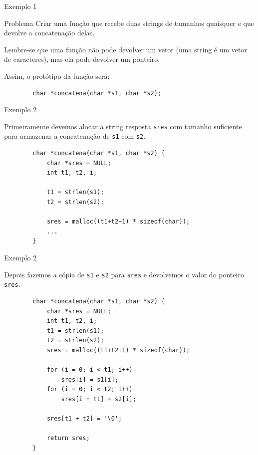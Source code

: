 \documentclass[handout]{beamer}
\newcommand{\cod}[1]{\texttt{#1}}
\begin{document}
\begin{frame}[fragile]{Exemplo 1}

    \begin{block}{Problema}
        Criar uma função que recebe duas strings de tamanhos quaisquer e que devolve a concatenação delas.
    \end{block}
    
    \pause
    Lembre-se que uma função não pode devolver um vetor (uma string é um vetor de caracteres), mas ela pode devolver um ponteiro.

    Assim, o protótipo da função será:
    \begin{verbatim}
        char *concatena(char *s1, char *s2);
    \end{verbatim}

\end{frame}

\begin{frame}[fragile]{Exemplo 2}
    
    Primeiramente devemos alocar a string resposta \cod{sres} com tamanho suficiente para armazenar a concatenação de \cod{s1} com \cod{s2}.

    \begin{verbatim}
        char *concatena(char *s1, char *s2) {
            char *sres = NULL;
            int t1, t2, i;
    
            t1 = strlen(s1);
            t2 = strlen(s2);

            sres = malloc((t1+t2+1) * sizeof(char));
            ...
        }
    \end{verbatim}

\end{frame}

\begin{frame}[fragile]{Exemplo 2}

    Depois fazemos a cópia de \cod{s1} e \cod{s2} para \cod{sres} e devolvemos o valor do ponteiro \cod{sres}.

    \begin{verbatim}
        char *concatena(char *s1, char *s2) {
            char *sres = NULL;
            int t1, t2, i;
            t1 = strlen(s1);
            t2 = strlen(s2);
            sres = malloc((t1+t2+1) * sizeof(char));

            for (i = 0; i < t1; i++)
                sres[i] = s1[i];
            for (i = 0; i < t2; i++)
                sres[i + t1] = s2[i];

            sres[t1 + t2] = '\0';

            return sres;
        }
    \end{verbatim}

\end{frame}
\end{document}
